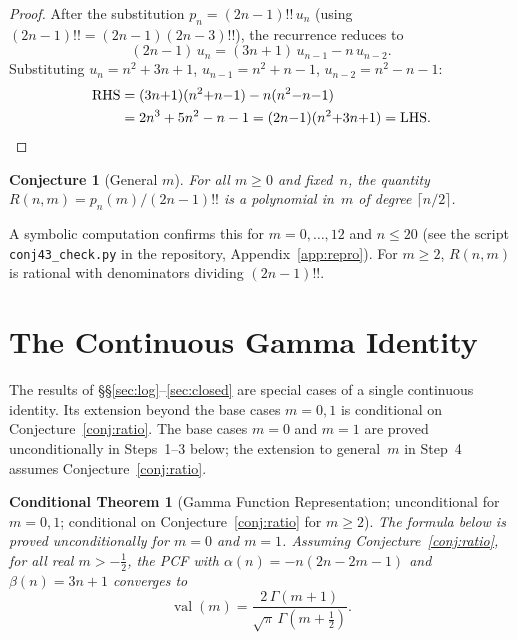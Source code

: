 \documentclass[11pt,a4paper]{article}
\theoremstyle{plain}
\newtheorem{conjecture}[theorem]{Conjecture}
\newtheorem{conditionaltheorem}[theorem]{Conditional Theorem}
\theoremstyle{definition}
\theoremstyle{remark}
\newcommand{\half}{\tfrac{1}{2}}
\newcommand{\dff}[1]{(#1)!!}
\begin{document}
\begin{proof}
After the substitution $p_n = \dff{2n{-}1}\,u_n$
(using $\dff{2n{-}1} = (2n{-}1)\dff{2n{-}3}$),
the recurrence reduces to
\begin{equation}\label{eq:ured}
  (2n{-}1)\,u_n = (3n{+}1)\,u_{n-1} - n\,u_{n-2}.
\end{equation}
Substituting $u_n = n^2{+}3n{+}1$, $u_{n-1} = n^2{+}n{-}1$,
$u_{n-2} = n^2{-}n{-}1$:
\begin{align*}
  \text{RHS} &= (3n{+}1)(n^2{+}n{-}1) - n(n^2{-}n{-}1) \\
  &= 2n^3 + 5n^2 - n - 1
   = (2n{-}1)(n^2{+}3n{+}1) = \text{LHS.}\qedhere
\end{align*}
\end{proof}

\begin{conjecture}[General $m$]\label{conj:Rnm}
For all $m \ge 0$ and fixed~$n$, the quantity
$R(n,m) = p_n(m)/\dff{2n{-}1}$
is a polynomial in~$m$ of degree $\lceil n/2 \rceil$.
\end{conjecture}

A symbolic computation confirms this for $m = 0, \ldots, 12$ and $n \le 20$
(see the script \texttt{conj43\_check.py} in the repository,
Appendix~\ref{app:repro}).
For $m \ge 2$, $R(n,m)$ is rational with denominators dividing
$\dff{2n{-}1}$.

\section{The Continuous Gamma Identity}\label{sec:gamma}

The results of \S\S\ref{sec:log}--\ref{sec:closed} are special
cases of a single continuous identity. Its extension beyond the
base cases $m=0,1$ is conditional on Conjecture~\ref{conj:ratio}.
The base cases $m=0$ and $m=1$ are proved unconditionally in Steps~1--3
below; the extension to general~$m$ in Step~4 assumes Conjecture~\ref{conj:ratio}.

\begin{conditionaltheorem}[Gamma Function Representation; unconditional for $m=0,1$; conditional on Conjecture~\ref{conj:ratio} for $m \geq 2$]\label{thm:gamma}
The formula below is proved unconditionally for $m=0$ and $m=1$.
Assuming Conjecture~\ref{conj:ratio}, for all real $m > -\frac{1}{2}$,
the PCF with
$\alpha(n) = -n(2n{-}2m{-}1)$ and $\beta(n) = 3n+1$
converges to
\[
  \operatorname{val}(m)
  = \frac{2\,\Gamma(m{+}1)}{\sqrt{\pi}\,\Gamma(m{+}\half)}.
\]
\end{conditionaltheorem}
\end{document}
